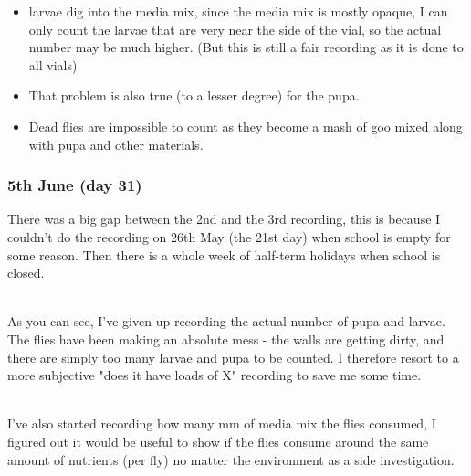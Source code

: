 \documentclass{article}
\begin{document}
\begin{itemize}
  \item larvae dig into the media mix, since the media mix is mostly opaque, I can only count the larvae that are very near the side of the vial, so the actual number may be much higher. (But this is still a fair recording as it is done to all vials)
  \item That problem is also true (to a lesser degree) for the pupa.
  \item Dead flies are impossible to count as they become a mash of goo mixed along with pupa and other materials.
\end{itemize}

\subsubsection{5th June (day 31)}

There was a big gap between the 2nd and the 3rd recording, this is because I couldn't do the recording on 26th May (the 21st day) when school is empty for some reason. Then there is a whole week of half-term holidays when school is closed.

\noindent\\
As you can see, I've given up recording the actual number of pupa and larvae. The flies have been making an absolute mess - the walls are getting dirty, and there are simply too many larvae and pupa to be counted. I therefore resort to a more subjective "does it have loads of X" recording to save me some time.

\noindent\\
I've also started recording how many mm of media mix the flies consumed, I figured out it would be useful to show if the flies consume around the same amount of nutrients (per fly) no matter the environment as a side investigation.\\
\end{document}
